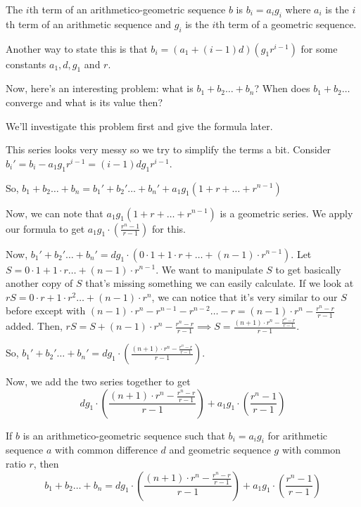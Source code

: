 \documentclass[11pt][mast]{lucky}
\begin{document}
\begin{defi}
The $i$th term of an arithmetico-geometric sequence $b$ is $b_{i}=a_{i}g_{i}$ where $a_{i}$ is the $i$th term of an arithmetic sequence and $g_{i}$ is the $i$th term of a geometric sequence.

Another way to state this is that $b_{i}=(a_{1}+(i-1)d)(g_{1}r^{i-1})$ for some constants $a_{1},d,g_{1}$ and $r$.
\end{defi}

Now, here's an interesting problem: what is $b_{1}+b_{2}\ldots+b_{n}$? When does $b_{1}+b_{2}\ldots $ converge and what is its value then?

We'll investigate this problem first and give the formula later.
\begin{pro}
This series looks very messy so we try to simplify the terms a bit.
Consider $b_{i}'=b_{i}-a_{1}g_{1}r^{i-1}=(i-1)dg_{1}r^{i-1}$.

So, $b_{1}+b_{2}\ldots + b_{n}=b_{1}'+b_{2}'\ldots + b_{n}'+a_{1}g_{1}(1+r+\ldots + r^{n-1})$

Now, we can note that $a_{1}g_{1}(1+r+\ldots + r^{n-1})$ is a geometric series. We apply our formula to get $a_{1}g_{1}\cdot (\frac{r^{n}-1}{r-1})$ for this.

Now, $b_{1}'+b_{2}'\ldots + b_{n}'=dg_{1}\cdot (0\cdot 1+1\cdot r+\ldots + (n-1)\cdot r^{n-1})$. Let $S=0\cdot 1+1\cdot r \ldots + (n-1)\cdot r^{n-1}$. We want to manipulate $S$ to get basically another copy of $S$ that's missing something we can easily calculate. If we look at $rS=0\cdot r+1\cdot r^2\ldots +(n-1)\cdot r^{n}$, we can notice that it's very similar to our $S$ before except with $(n-1)\cdot r^{n}-r^{n-1}-r^{n-2}\ldots-r=(n-1)\cdot r^{n}-\frac{r^{n}-r}{r-1}$ added. Then, $rS=S+(n-1)\cdot r^{n}-\frac{r^{n}-r}{r-1}\implies S=\frac{(n+1)\cdot r^{n}-\frac{r^{n}-r}{r-1}}{r-1}$.

So, $b_{1}'+b_{2}'\ldots + b_{n}'=dg_{1}\cdot (\frac{(n+1)\cdot r^{n}-\frac{r^{n}-r}{r-1}}{r-1})$.

Now, we add the two series together to get
$$dg_{1}\cdot (\frac{(n+1)\cdot r^{n}-\frac{r^{n}-r}{r-1}}{r-1})+a_{1}g_{1}\cdot (\frac{r^{n}-1}{r-1})$$
\end{pro}

\begin{theo}
If $b$ is an arithmetico-geometric sequence such that $b_{i}=a_{i}g_{i}$ for arithmetic sequence $a$ with common difference $d$ and geometric sequence $g$ with common ratio $r$, then
$$b_{1}+b_{2}\ldots + b_{n} = dg_{1}\cdot (\frac{(n+1)\cdot r^{n}-\frac{r^{n}-r}{r-1}}{r-1})+a_{1}g_{1}\cdot (\frac{r^{n}-1}{r-1})$$
\end{theo}
\end{document}
